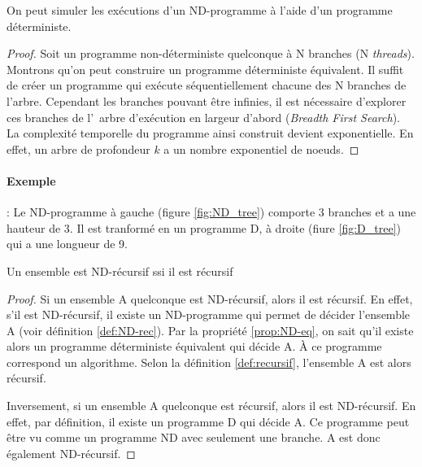 \begin{myprop} \label{prop:ND-eq}
	On peut simuler les exécutions d'un ND-programme à l'aide d'un programme
	déterministe.
	\begin{proof}
		Soit un programme non-déterministe quelconque à N branches (N \textit{threads}).
		Montrons qu'on peut construire un programme déterministe équivalent.
		Il suffit de créer un programme qui exécute séquentiellement chacune des N branches de l'arbre.
		Cependant les branches pouvant être infinies, il est nécessaire d'explorer ces branches de l'\ arbre d'exécution en largeur d'abord (\textit{Breadth First Search}). La complexité temporelle du programme ainsi construit devient exponentielle.  En effet, un arbre de profondeur $k$ a un nombre exponentiel de noeuds.
	\end{proof}
\end{myprop}

\paragraph{Exemple} : Le ND-programme à gauche (figure \ref{fig:ND_tree}) comporte 3 branches et  a une hauteur de 3. Il est tranformé en un programme D, à droite (fiure \ref{fig:D_tree}) qui a une longueur de 9. \\
	

\begin{myprop}
	Un ensemble est ND-récursif ssi il est récursif
	\begin{proof}
		Si un ensemble A quelconque est ND-récursif, alors il est récursif.
		En effet, s'il est ND-récursif, il existe un ND-programme qui permet de décider l'ensemble A (voir définition \ref{def:ND-rec}).
		Par la propriété \ref{prop:ND-eq}, on sait qu'il existe alors un programme déterministe équivalent qui décide A. À ce programme correspond un algorithme.
		Selon la définition \ref{def:recursif}, l'ensemble A est alors récursif.

		Inversement, si un ensemble A quelconque est récursif, alors il est ND-récursif. En effet, par définition, il existe un programme D qui décide A.
		Ce programme peut être vu comme un programme ND avec seulement une branche. A est donc également ND-récursif.
	\end{proof}
\end{myprop}

